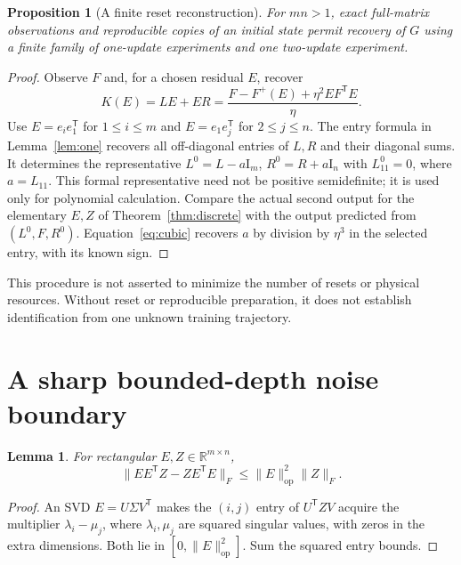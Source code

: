 \documentclass[11pt]{article}
\newtheorem{proposition}[theorem]{Proposition}
\newtheorem{lemma}[theorem]{Lemma}
\theoremstyle{remark}\newtheorem{remark}[theorem]{Remark}
\newcommand{\R}{\mathbb R}
\newcommand{\Id}{\mathrm I}
\newcommand{\op}{\mathrm{op}}
\begin{document}
\begin{proposition}[A finite reset reconstruction]
For $mn>1$, exact full-matrix observations and reproducible copies of an
initial state permit recovery of $G$ using a finite family of one-update
experiments and one two-update experiment.
\end{proposition}
\begin{proof}
Observe $F$ and, for a chosen residual $E$, recover
\[
 K(E)=LE+ER=\frac{F-F^+(E)+\eta^2EF^{\mathsf T}E}{\eta}.
\]
Use $E=e_i e_1^{\mathsf T}$ for $1\leq i\leq m$ and
$E=e_1e_j^{\mathsf T}$ for $2\leq j\leq n$.
The entry formula in Lemma~\ref{lem:one} recovers all off-diagonal
entries of $L,R$ and their diagonal sums. It determines the representative
$L^0=L-a\Id_m$, $R^0=R+a\Id_n$ with $L^0_{11}=0$, where $a=L_{11}$.
This formal representative need not be positive semidefinite; it is
used only for polynomial calculation. Compare the actual second output
for the elementary $E,Z$ of Theorem~\ref{thm:discrete} with the output
predicted from $(L^0,F,R^0)$. Equation~\eqref{eq:cubic} recovers $a$
by division by $\eta^3$ in the selected entry, with its known sign.
\end{proof}
This procedure is not asserted to minimize the number of resets or
physical resources. Without reset or reproducible preparation, it does
not establish identification from one unknown training trajectory.

\section{A sharp bounded-depth noise boundary}
\begin{lemma}\label{lem:norm}
For rectangular $E,Z\in\R^{m\times n}$,
\[
 \|EE^{\mathsf T}Z-ZE^{\mathsf T}E\|_F
       \leq\|E\|_{\op}^2\|Z\|_F.
\]
\end{lemma}
\begin{proof}
An SVD $E=U\Sigma V^{\mathsf T}$ makes the $(i,j)$ entry of
$U^{\mathsf T}ZV$ acquire the multiplier $\lambda_i-\mu_j$, where
$\lambda_i,\mu_j$ are squared singular values, with zeros in the extra
dimensions. Both lie in $[0,\|E\|_{\op}^2]$. Sum the squared entry bounds.
\end{proof}
\end{document}
